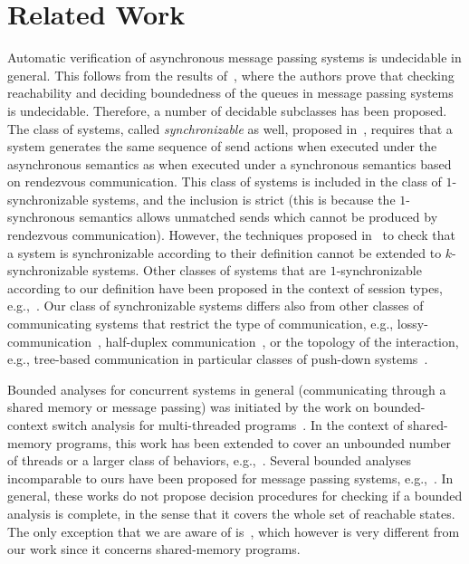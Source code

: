 \section{Related Work}

Automatic verification of asynchronous message passing systems is undecidable in general. This follows from the results of~\cite{DBLP:journals/jacm/BrandZ83}, where the authors prove that checking reachability and deciding boundedness of the queues in message passing systems is undecidable. 
Therefore, a number of decidable subclasses has been proposed. 
The class of systems, called \emph{synchronizable} as well, proposed in~\cite{DBLP:journals/tcs/BasuB16}, requires that a system generates the same sequence of send actions when executed under the asynchronous semantics as when executed under a synchronous semantics based on rendezvous communication. This class of systems is included in the class of $1$-synchronizable systems, and the inclusion is strict (this is because the $1$-synchronous semantics allows unmatched sends which cannot be produced by rendezvous communication). However, the techniques proposed in~\cite{DBLP:journals/tcs/BasuB16} to check that a system is synchronizable according to their definition cannot be extended to $k$-synchronizable systems.
Other classes of systems that are $1$-synchronizable according to our definition have been proposed in the context of session types, e.g.,~\cite{DBLP:conf/esop/DenielouY12,DBLP:journals/jacm/HondaYC16,DBLP:conf/esop/HondaVK98,DBLP:conf/popl/LangeTY15}. 
Our class of synchronizable systems differs also from other classes of communicating systems that restrict the type of communication, e.g., lossy-communication~\cite{DBLP:journals/iandc/AbdullaJ96}, half-duplex communication~\cite{DBLP:journals/iandc/CeceF05}, or the topology of the interaction, e.g., tree-based communication in particular classes of push-down systems~\cite{DBLP:conf/tacas/TorreMP08,DBLP:journals/corr/abs-1209-0359}.

Bounded analyses for concurrent systems in general (communicating through a shared memory or message passing) was initiated by the work on bounded-context switch analysis for multi-threaded programs~\cite{DBLP:conf/pldi/QadeerW04,DBLP:conf/tacas/QadeerR05,DBLP:conf/cav/LalR08}. In the context of shared-memory programs, this work has been extended to cover an unbounded number of threads or a larger class of behaviors, e.g.,~\cite{DBLP:conf/sas/BouajjaniEP11,DBLP:conf/popl/EmmiQR11,DBLP:conf/spin/KiddJV10,DBLP:conf/cav/TorreMP10}. Several bounded analyses incomparable to ours have been proposed for message passing systems, e.g.,~\cite{DBLP:conf/tacas/TorreMP08,DBLP:conf/tacas/BouajjaniE12}. In general, these works do not propose decision procedures for checking if a bounded analysis is complete, in the sense that it covers the whole set of reachable states. The only exception that we are aware of is~\cite{DBLP:conf/cav/TorreMP10}, which however is very different from our work since it concerns shared-memory programs.

